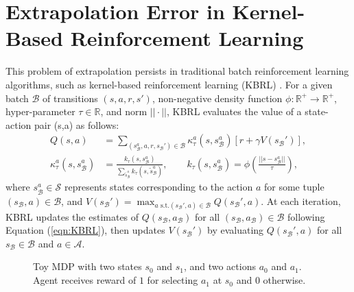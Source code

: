 \documentclass{article}
\newcommand{\y}{\gamma}
\newcommand{\lp}{\left (}
\newcommand{\rp}{\right )}
\newcommand{\B}{\mathcal{B}}
\begin{document}
\clearpage

\section{Extrapolation Error in Kernel-Based Reinforcement Learning}

This problem of extrapolation persists in traditional batch reinforcement learning algorithms, such as kernel-based reinforcement learning (KBRL) \citep{ormoneit2002kernel}. For a given batch $\B$ of transitions $(s,a,r,s')$, non-negative density function $\phi: \mathbb{R}^+ \rightarrow \mathbb{R}^+$, hyper-parameter $\tau \in \mathbb{R}$, and norm $|| \cdot ||$, KBRL evaluates the value of a state-action pair (s,a) as follows: 
\begin{align} \label{eqn:KBRL}
Q(s,a) &= \sum_{(s_\B^a, a, r, s_\B') \in \B} \kappa^a_\tau(s,s_\B^a)[r + \y V(s_\B')], \\
\kappa_\tau^a (s,s_\B^a) &= \frac{k_\tau(s,s_\B^a)}{\sum_{\tilde s_\B^a} k_\tau(s, \tilde s_\B^a)}, \qquad k_\tau(s,s_\B^a) = \phi \lp \frac{||s - s_\B^a||}{\tau} \rp,
\end{align}
where $s_\B^a \in \mathcal{S}$ represents states corresponding to the action $a$ for some tuple $(s_\B, a) \in \B$, and $V(s_\B') = \max_{a \text{ s.t.} (s_\B', a) \in \B} Q(s_\B', a)$. At each iteration, KBRL updates the estimates of $Q(s_\B,a_\B)$ for all $(s_\B,a_\B) \in \B$ following Equation (\ref{eqn:KBRL}), then updates $V(s_\B')$ by evaluating $Q(s_\B',a)$ for all $s_\B \in \B$ and $a \in \mathcal{A}$.

\begin{figure}[ht]
\centering
{}
\caption{Toy MDP with two states $s_0$ and $s_1$, and two actions $a_0$ and $a_1$. Agent receives reward of $1$ for selecting $a_1$ at $s_0$ and $0$ otherwise.}
\label{fig:MDP}
\end{figure}
\end{document}
